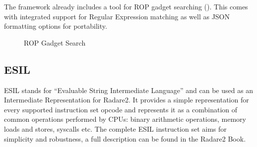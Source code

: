 The framework already includes a tool for ROP gadget searching (). This comes with integrated support for Regular Expression matching as well as JSON formatting options for portability.

\begin{figure}[htp]%
	\centering
	\hfill
	\caption{ROP Gadget Search}
	\label{fig:gadgetsearch}
\end{figure}

\subsection{ESIL}

ESIL stands for ``Evaluable String Intermediate Language'' and can be used as an Intermediate Representation for Radare2. It provides a simple representation for every supported instruction set opcode and represents it as a combination of common operations performed by CPUs: binary arithmetic operations, memory loads and stores, syscalls etc. The complete ESIL instruction set aims for simplicity and robustness, a full description can be found in the Radare2 Book\cite{maijin2016r2book}.

